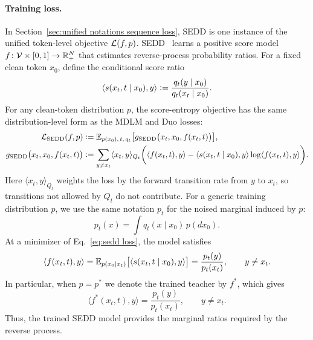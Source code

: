 \paragraph{Training loss.}
In Section~\ref{sec:unified notations sequence loss}, SEDD is one instance of the unified token-level objective $\mathcal{L}(f,p)$. SEDD~\citep{lou2024discrete} learns a positive score model $f\colon \mathcal{V}\times[0,1]\to\mathbb{R}_{+}^{N}$ that estimates reverse-process probability ratios. For a fixed clean token $x_0$, define the conditional score ratio
\[
    \langle s(x_t,t\mid x_0),y\rangle
    \vcentcolon=
    \frac{q_t(y\mid x_0)}{q_t(x_t\mid x_0)}.
\]
For any clean-token distribution $p$, the score-entropy objective has the same distribution-level form as the MDLM and Duo losses:
\begin{equation}
\label{eq:sedd loss}
\begin{aligned}
\mathcal{L}_{\mathrm{SEDD}}(f,p)
&\vcentcolon=
\mathbb{E}_{p(x_0),\,t,\,q_t}
\bigl[
    g_{\mathrm{SEDD}}\bigl(x_t,x_0,f(x_t,t)\bigr)
\bigr],
\\
g_{\mathrm{SEDD}}\bigl(x_t,x_0,f(x_t,t)\bigr)
&\vcentcolon=
\sum_{y \neq x_t} \langle x_t,y\rangle_{Q_t}
\biggl(
\langle f(x_t,t),y\rangle
- \langle s(x_t,t\mid x_0),y\rangle
\log \langle f(x_t,t),y\rangle
\biggr).
\end{aligned}
\end{equation}
Here $\langle x_t,y\rangle_{Q_t}$ weights the loss by the forward transition rate from $y$ to $x_t$, so transitions not allowed by $Q_t$ do not contribute. For a generic training distribution $p$, we use the same notation $p_t$ for the noised marginal induced by $p$:
\[
    p_t(x)=\int q_t(x\mid x_0)\,p(dx_0).
\]
At a minimizer of Eq.~\eqref{eq:sedd loss}, the model satisfies
\begin{equation}
\label{eq:sedd-generic-optimum}
    \langle f(x_t,t),y\rangle
    =
    \mathbb{E}_{p(x_0\mid x_t)}
    \bigl[
    \langle s(x_t,t\mid x_0),y\rangle
    \bigr]
    =
    \frac{p_t(y)}{p_t(x_t)}, \qquad y\neq x_t .
\end{equation}
In particular, when $p=p^*$ we denote the trained teacher by $f^*$, which gives
\begin{equation}
    \langle f^{*}(x_t,t),y\rangle
    =
    \frac{p_t(y)}{p_t(x_t)}, \qquad y\neq x_t .
    \label{eq:sedd optimal ratio}
\end{equation}
Thus, the trained SEDD model provides the marginal ratios required by the reverse process.

